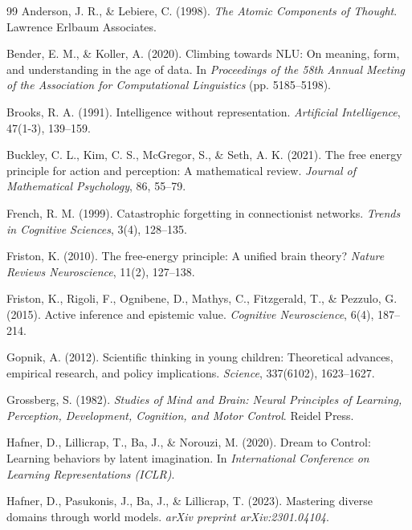 \documentclass[preprint,12pt]{elsarticle}
\begin{document}
\begin{thebibliography}{99}
\small
{}
Anderson, J. R., \& Lebiere, C. (1998). \textit{The Atomic Components of Thought}. Lawrence Erlbaum Associates.

Bender, E. M., \& Koller, A. (2020). Climbing towards NLU: On meaning, form, and understanding in the age of data. In \textit{Proceedings of the 58th Annual Meeting of the Association for Computational Linguistics} (pp. 5185--5198).

Brooks, R. A. (1991). Intelligence without representation. \textit{Artificial Intelligence}, 47(1-3), 139--159.

Buckley, C. L., Kim, C. S., McGregor, S., \& Seth, A. K. (2021). The free energy principle for action and perception: A mathematical review. \textit{Journal of Mathematical Psychology}, 86, 55--79.

French, R. M. (1999). Catastrophic forgetting in connectionist networks. \textit{Trends in Cognitive Sciences}, 3(4), 128--135.

Friston, K. (2010). The free-energy principle: A unified brain theory? \textit{Nature Reviews Neuroscience}, 11(2), 127--138.

Friston, K., Rigoli, F., Ognibene, D., Mathys, C., Fitzgerald, T., \& Pezzulo, G. (2015). Active inference and epistemic value. \textit{Cognitive Neuroscience}, 6(4), 187--214.

Gopnik, A. (2012). Scientific thinking in young children: Theoretical advances, empirical research, and policy implications. \textit{Science}, 337(6102), 1623--1627.

Grossberg, S. (1982). \textit{Studies of Mind and Brain: Neural Principles of Learning, Perception, Development, Cognition, and Motor Control}. Reidel Press.

Hafner, D., Lillicrap, T., Ba, J., \& Norouzi, M. (2020). Dream to Control: Learning behaviors by latent imagination. In \textit{International Conference on Learning Representations (ICLR)}.

Hafner, D., Pasukonis, J., Ba, J., \& Lillicrap, T. (2023). Mastering diverse domains through world models. \textit{arXiv preprint arXiv:2301.04104}.


\end{thebibliography}
\end{document}
